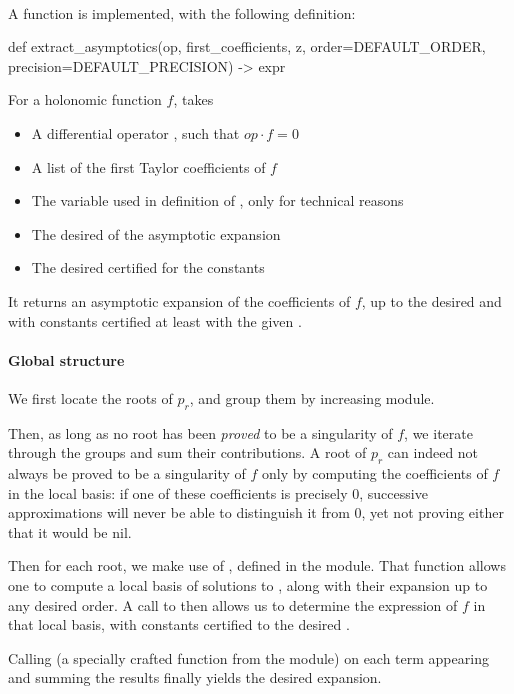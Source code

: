 \documentclass[../main.tex]{subfiles}
\begin{document}
\paragraph{}

A function  is implemented, with the following definition:

\begin{pyblock}
def extract_asymptotics(op,
						first_coefficients,
						z,
						order=DEFAULT_ORDER,
						precision=DEFAULT_PRECISION) -> expr
\end{pyblock}

For a holonomic function $f$,  takes

\begin{itemize}
	\item A differential operator , such that $op \cdot f = 0$
	
	\item A list  of the first Taylor coefficients of $f$
	
	\item The variable  used in definition of , only for technical reasons
	
	\item The desired  of the asymptotic expansion
	
	\item The desired certified  for the constants
\end{itemize}

It returns an asymptotic expansion of the coefficients of $f$, up to the desired  and with constants certified at least with the given .

\paragraph{Global structure}

We first locate the roots of $p_r$, and group them by increasing module.

Then, as long as no root has been \textit{proved} to be a singularity of $f$, we iterate through the groups and sum their contributions. A root of $p_r$ can indeed not always be proved to be a singularity of $f$ only by computing the coefficients of $f$ in the local basis: if one of these coefficients is precisely 0, successive approximations will never be able to distinguish it from 0, yet not proving either that it would be nil.

Then for each root, we make use of , defined in the  module. That function allows one to compute a local basis of solutions to , along with their expansion up to any desired order. A call to  then allows us to determine the expression of $f$ in that local basis, with constants certified to the desired .

Calling  (a specially crafted function from the  module) on each term appearing and summing the results finally yields the desired expansion.
\end{document}
